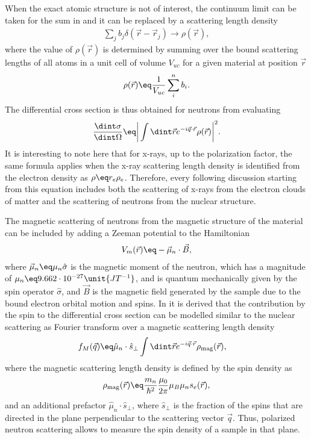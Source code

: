 \documentclass[\main/dresen_thesis.tex]{subfiles}
\begin{document}
When the exact atomic structure is not of interest, the continuum limit can be taken for the sum in  and it can be replaced by a scattering length density
\begin{align}
  \sum_j b_j \delta(\vec{r} - \vec{r}_j) \rightarrow \rho(\vec{r}),
\end{align}
where the value of $\rho(\vec{r})$ is determined by summing over the bound scattering lengths of all atoms in a unit cell of volume $V_{uc}$ for a given material at position $\vec{r}$
\begin{align}
  \rho(\vec{r}) \eq \frac{1}{V_{uc}} \sum_i^n b_i.
\end{align}
The differential cross section is thus obtained for neutrons from evaluating
\begin{align}
  \frac{\dint \sigma}{\dint \Omega} \eq \bigg| \int \dint \vec{r} e^{-i\vec{q} \cdot \vec{r}} \rho (\vec{r}) \bigg|^2.
  \label{eq:theoreticalBackground:scattering:scatteringTheory:differentialCrossSectionBornApproximation}
\end{align}
It is interesting to note here that for x-rays, up to the polarization factor, the same formula applies when the x-ray scattering length density is identified from the electron density as $\rho \eq r_e \rho_e$.
Therefore, every following discussion starting from this equation includes both the scattering of x-rays from the electron clouds of matter and the scattering of neutrons from the nuclear structure.

The magnetic scattering of neutrons from the magnetic structure of the material can be included by adding a Zeeman potential to the Hamiltonian
\begin{align}
  V_m (\vec{r}) \eq - \vec{\mu}_n \cdot \vec{B},
\end{align}
where $\vec{\mu}_n \eq \mu_n \hat{\sigma}$ is the magnetic moment of the neutron, which has a magnitude of $\mu_n \eq 9.662 \cdot 10^{-27} \unit{JT^{-1}}$, and is quantum mechanically given by the spin operator $\hat{\sigma}$, and $\vec{B}$ is the magnetic field generated by the sample due to the bound electron orbital motion and spins.
In  it is derived that the contribution by the spin to the differential cross section can be modelled similar to the nuclear scattering as Fourier transform over a magnetic scattering length density
\begin{align}
  f_M (\vec{q}) \eq & \hat{\mu}_n \cdot \hat{s}_\perp \int \dint \vec{r} e^{- i \vec{q} \cdot \vec{r}} \rho_\mathrm{mag}(\vec{r}),
\end{align}
where the magnetic scattering length density is defined by the spin density as
\begin{align}
  \rho_\mathrm{mag} (\vec{r}) \eq \frac{m_n}{\hbar^2}  \frac{\mu_0}{2\pi} \mu_B \mu_n s_e (\vec{r}),
\end{align}
and an additional prefactor $\hat{\mu}_n \cdot \hat{s}_\perp$, where $\hat{s}_\perp$ is the fraction of the spins that are directed in the plane perpendicular to the scattering vector $\vec{q}$.
Thus, polarized neutron scattering allows to measure the spin density of a sample in that plane.
\end{document}
